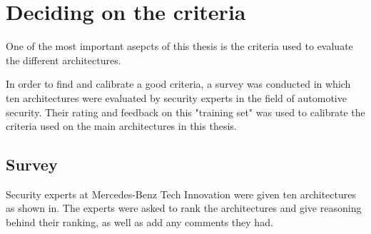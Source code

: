 \chapter{Deciding on the criteria}
\label{chp:criteria}

One of the most important asepcts of this thesis is the criteria used to evaluate the different architectures.

In order to find and calibrate a good criteria, a survey was conducted in which ten architectures were evaluated by security experts in the field of automotive security.
Their rating and feedback on this "training set" was used to calibrate the criteria used on the main architectures in this thesis.

\section{Survey}
\label{sec:survey}

Security experts at Mercedes-Benz Tech Innovation were given ten architectures as shown in.
The experts were asked to rank the architectures and give reasoning behind their ranking, as well as add any comments they had.

